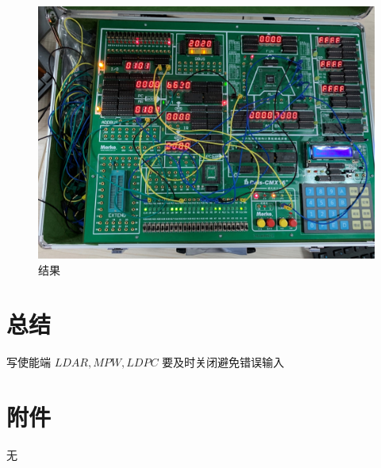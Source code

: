 \documentclass[a4paper,10pt,UTF8]{paper}
\numberwithin{equation}{section}
\numberwithin{figure}{section}
\begin{document}
\begin{figure}[h]
  \centering
  \includegraphics[width=0.8\linewidth]{5.jpg}
  \caption{ 结果}
  \label{fig:5}
\end{figure}

\section{总结}

写使能端 $LDAR, MPW, LDPC$ 要及时关闭避免错误输入


\section{附件}

无
\end{document}
